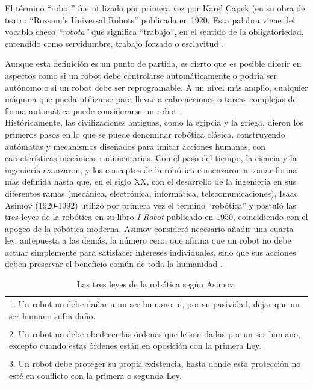 El término “robot” fue utilizado por primera vez por Karel Capek (en su obra de teatro “Rossum’s Universal Robots” publicada en 1920. Esta palabra viene del vocablo checo \textit{“robota”} que significa “trabajo”, en el sentido de la obligatoriedad, entendido como servidumbre, trabajo forzado o esclavitud \cite{Sanchez07a}.

Aunque esta definición es un punto de partida, es cierto que es posible diferir en aspectos como si un robot debe controlarse automáticamente o podría ser autónomo o si un robot debe ser reprogramable. A un nivel más amplio, cualquier máquina que pueda utilizarse para llevar a cabo acciones o tareas complejas de forma automática puede considerarse un robot \cite{Raj19}.\\

Históricamente, las civilizaciones antiguas, como la egipcia y la griega, dieron los primeros pasos en lo que se puede denominar robótica clásica, construyendo autómatas y mecanismos diseñados para imitar acciones humanas, con características mecánicas rudimentarias. 
Con el paso del tiempo, la ciencia y la ingeniería avanzaron, y los conceptos de la robótica comenzaron a tomar forma más definida hasta que, en el siglo XX, con el desarrollo de la ingeniería en sus diferentes ramas (mecánica, electrónica, informática, telecomunicaciones), Isaac Asimov (1920-1992) utilizó por primera vez el término “robótica” y postuló las tres leyes de la robótica en su libro \textit{I Robot} publicado en 1950, coincidiendo con el apogeo de la robótica moderna. Asimov consideró necesario añadir una cuarta ley, antepuesta a las demás, la número cero, que afirma que un robot no debe actuar simplemente para satisfacer intereses individuales, sino que sus acciones deben preservar el beneficio común de toda la humanidad \cite{Sanchez07b}.

\pagebreak

\begin{table} [h!]
  \begin{center}
    \begin{tabular}{p{15cm}} %
      \hline
      1. Un robot no debe dañar a un ser humano ni, por su pasividad, dejar que un ser humano sufra daño.\\\\
    
      2. Un robot no debe obedecer las órdenes que le son dadas por un ser humano, excepto cuando estas órdenes están en oposición con la primera Ley.\\\\
    
      3. Un robot debe proteger su propia existencia, hasta donde esta protección no esté en conflicto con la primera o segunda Ley. \\
      \hline
    \end{tabular}
  \end{center}
  \caption{Las tres leyes de la robótica según Asimov.}
  \label{cuadro:leyesrobotica_Asimov}
\end{table}

